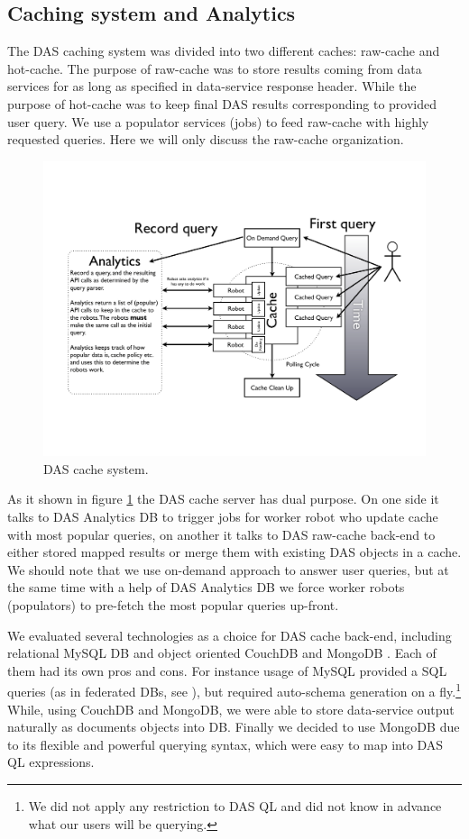 \documentclass[a4paper]{jpconf}
\begin{document}
\subsection{Caching system and Analytics}
The DAS caching system was divided into two different caches: raw-cache and hot-cache.
The purpose of raw-cache was to store results coming from data services for
as long as specified in data-service response header. While the purpose of hot-cache
was to keep final DAS results corresponding to provided user query. We use a populator
services (jobs) to feed raw-cache with highly requested queries. Here we will only
discuss the raw-cache organization. 
\begin{figure}[htb]
\centering
\includegraphics[width=150mm]{DAS_Cache_and_Analytics.pdf}
\caption{
DAS cache system.
}
\label{DAS_cache}
\end{figure}
As it shown in figure \ref{DAS_cache} the DAS cache server has dual purpose.
On one side it talks to DAS Analytics DB to trigger jobs for worker robot
who update cache with most popular queries, on another it talks to DAS
raw-cache back-end to either stored mapped results or merge them with 
existing DAS objects in a cache. We should note that we use on-demand
approach to answer user queries, but at the same time with a help of
DAS Analytics DB we force worker robots (populators) to pre-fetch
the most popular queries up-front.

We evaluated several technologies
as a choice for DAS cache back-end, including relational MySQL DB \cite{MySQL} 
and object oriented CouchDB \cite{CouchDB} and MongoDB \cite{MongoDB}.
Each of them had its own pros and cons. For instance usage
of MySQL provided a SQL queries (as in federated DBs, see \cite{FedDB}), but
required auto-schema generation on a fly.\footnote{We did not apply any
restriction to DAS QL and did not know in advance what our users will be
querying.} While, using CouchDB and MongoDB, we were able to store
data-service output naturally as documents objects into DB. Finally we decided
to use MongoDB due to its flexible and
powerful querying syntax, which were easy to map into DAS QL expressions. 
\end{document}
